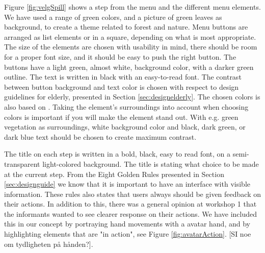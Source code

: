 Figure \ref{fig:velgSpill} shows a step from the menu and the different menu elements. We have used a range of green colors, and a picture of green leaves as background, to create a theme related to forest and nature. Menu buttons are arranged as list elements or in a square, depending on what is most appropriate. The size of the elements are chosen with usability in mind, there should be room for a proper font size, and it should be easy to push the right button. The buttons have a light green, almost white, background color, with a darker green outline. The text is written in black with an easy-to-read font. The contrast between button background and text color is chosen with respect to design guidelines for elderly, presented in Section \ref{sec:designelderly}. The chosen colors is also based on \cite{blindeforbundetTekst}. Taking the element's surroundings into account when choosing colors is important if you will make the element stand out. With e.g. green vegetation as surroundings, white background color and black, dark green, or dark blue text should be chosen to create maximum contrast.   

The title on each step is written in a bold, black, easy to read font, on a semi-transparent light-colored background. The title is stating what choice to be made at the current step. From the Eight Golden Rules presented in Section \ref{sec:designguide} we know that it is important to have an interface with visible information. These rules also states that users always should be given feedback on their actions. In addition to this, there was a general opinion at workshop 1 that the informants wanted to see clearer response on their actions. We have included this in our concept by portraying hand movements with a avatar hand, and by highlighting elements that are "in action", see Figure \ref{fig:avatarAction}. [SI noe om tydligheten på hånden?].  

